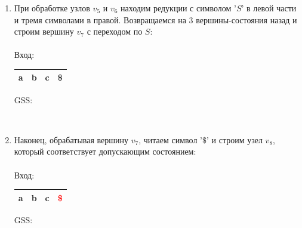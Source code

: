 \begin{example}
\begin{enumerate}
        \item При обработке узлов $v_5$ и $v_6$ находим редукции с символом '$S$' в левой части и тремя символами в правой. Возвращаемся на 3 вершины-состояния назад и строим вершину $v_7$ с переходом по $S$: \\ \\
        Вход: \,
        \begin{tabular}[c]{ |c|c|c|c| }
            \hline a & b & c & \$ \\ \hline
        \end{tabular}
        \qquad GSS: \,
        
        \\
        \item Наконец, обрабатывая вершину $v_7$, читаем символ '$\$$' и строим узел $v_8$, который соответствует допускающим состоянием: \\ \\
        Вход: \,
        \begin{tabular}[c]{ |c|c|c|c| }
            \hline a & b & c & \textcolor{red}{\$} \\ \hline
        \end{tabular}
        \qquad GSS: \,
        
        \\
    \end{enumerate}



\end{example}
